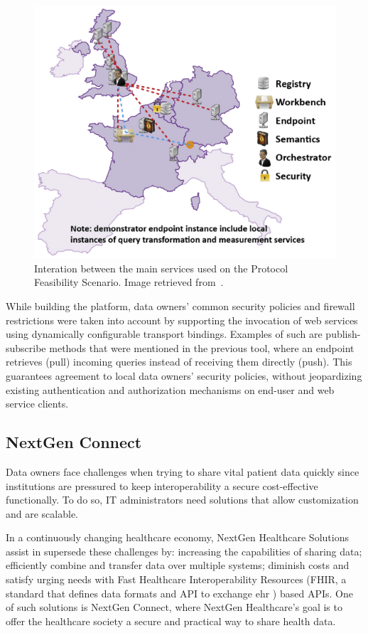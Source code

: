 \begin{figure}[H]
    \centering
    \includegraphics[width=.7\linewidth]{ehr4cr.png}
    \caption{Interation between the main services used on the Protocol Feasibility Scenario. Image retrieved from~\cite{ehr4cr}.}
\end{figure}

While building the platform, data owners' common security policies and firewall restrictions were taken into account by supporting the invocation of web services using dynamically configurable transport bindings.
Examples of such are publish-subscribe methods that were mentioned in the previous tool, where an endpoint retrieves (pull) incoming queries instead of receiving them directly (push).
This guarantees agreement to local data owners' security policies, without jeopardizing existing authentication and authorization mechanisms on end-user and web service clients.

\subsection*{NextGen Connect}
Data owners face challenges when trying to share vital patient data quickly since institutions are pressured to keep interoperability a secure cost-effective functionally.
To do so, IT administrators need solutions that allow customization and are scalable.

In a continuously changing healthcare economy, NextGen Healthcare Solutions assist in supersede these challenges by: increasing the capabilities of sharing data; efficiently combine and transfer data over multiple systems; diminish costs and satisfy urging needs with Fast Healthcare Interoperability Resources (FHIR, a standard that defines data formats and API to exchange \gls{ehr} ) based APIs.
One of such solutions is NextGen Connect, where NextGen Healthcare's goal is to offer the healthcare society a secure and practical way to share health data.

